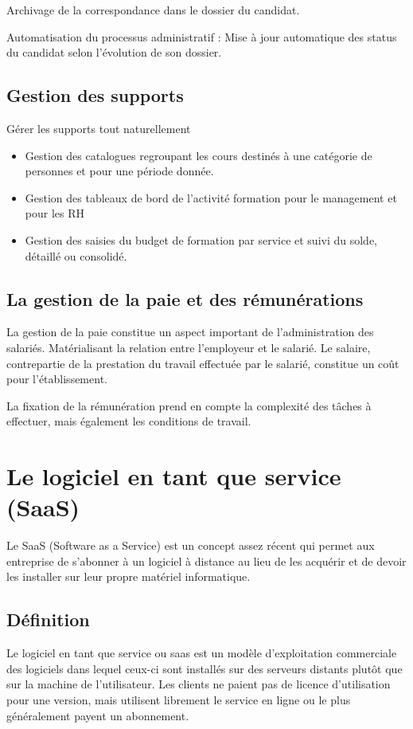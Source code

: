 Archivage de la correspondance dans le dossier du candidat.
\medskip

Automatisation du processus administratif : Mise à jour automatique des status du candidat selon l'évolution de son dossier.

\subsection{Gestion des supports}
Gérer les supports tout naturellement

\begin{itemize}
	\item[\checkmark] Gestion des catalogues regroupant les cours destinés à une catégorie de personnes et pour une période donnée.
	\item[\checkmark] Gestion des tableaux de bord de l'activité formation pour le management et pour les RH
	\item[\checkmark] Gestion des saisies du budget de formation par service et suivi du solde, détaillé ou consolidé.
\end{itemize}

\subsection{La gestion de la paie et des rémunérations}
La gestion de la paie constitue un aspect important de l'administration des salariés. Matérialisant la relation entre l'employeur et le salarié. Le salaire, contrepartie de la prestation du travail effectuée par le salarié, constitue un coût pour l'établissement.
\medskip

La fixation de la rémunération prend en compte la complexité des tâches à effectuer, mais également les conditions de travail.
\clearpage

\section{Le logiciel en tant que service (SaaS)}
Le SaaS (Software as a Service) est un concept assez récent qui permet aux entreprise de s'abonner à un logiciel à distance au lieu de les acquérir et de devoir les installer sur leur propre matériel informatique.

\subsection{Définition}
Le logiciel en tant que service ou \gls{saas} \cite{SaaS} est un modèle d'exploitation commerciale des logiciels dans lequel ceux-ci sont installés sur des serveurs distants plutôt que sur la machine de l'utilisateur. Les clients ne paient pas de licence d'utilisation pour une version, mais utilisent librement le service en ligne ou le plus généralement payent un abonnement.
\medskip


